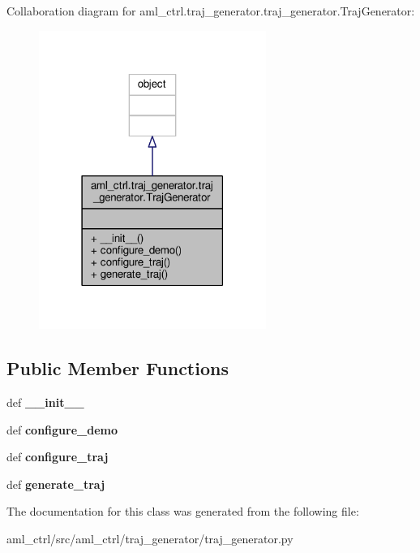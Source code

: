 Collaboration diagram for aml\-\_\-ctrl.\-traj\-\_\-generator.\-traj\-\_\-generator.\-Traj\-Generator\-:
\nopagebreak
\begin{figure}[H]
\begin{center}
\leavevmode
\includegraphics[width=210pt]{classaml__ctrl_1_1traj__generator_1_1traj__generator_1_1_traj_generator__coll__graph}
\end{center}
\end{figure}
\subsection*{Public Member Functions}
\begin{DoxyCompactItemize}
\item 
\hypertarget{classaml__ctrl_1_1traj__generator_1_1traj__generator_1_1_traj_generator_a31360c34bfed75e4a54fab91c93d49c2}{def {\bfseries \-\_\-\-\_\-init\-\_\-\-\_\-}}\label{classaml__ctrl_1_1traj__generator_1_1traj__generator_1_1_traj_generator_a31360c34bfed75e4a54fab91c93d49c2}

\item 
\hypertarget{classaml__ctrl_1_1traj__generator_1_1traj__generator_1_1_traj_generator_a16f4cfdbab3c1db8eaaaa4f097fe324f}{def {\bfseries configure\-\_\-demo}}\label{classaml__ctrl_1_1traj__generator_1_1traj__generator_1_1_traj_generator_a16f4cfdbab3c1db8eaaaa4f097fe324f}

\item 
\hypertarget{classaml__ctrl_1_1traj__generator_1_1traj__generator_1_1_traj_generator_aa826e4e07593593b5501ae443ca1f244}{def {\bfseries configure\-\_\-traj}}\label{classaml__ctrl_1_1traj__generator_1_1traj__generator_1_1_traj_generator_aa826e4e07593593b5501ae443ca1f244}

\item 
\hypertarget{classaml__ctrl_1_1traj__generator_1_1traj__generator_1_1_traj_generator_ab1d608cf96839a45eea2234d99d22934}{def {\bfseries generate\-\_\-traj}}\label{classaml__ctrl_1_1traj__generator_1_1traj__generator_1_1_traj_generator_ab1d608cf96839a45eea2234d99d22934}

\end{DoxyCompactItemize}


The documentation for this class was generated from the following file\-:\begin{DoxyCompactItemize}
\item 
aml\-\_\-ctrl/src/aml\-\_\-ctrl/traj\-\_\-generator/traj\-\_\-generator.\-py\end{DoxyCompactItemize}
